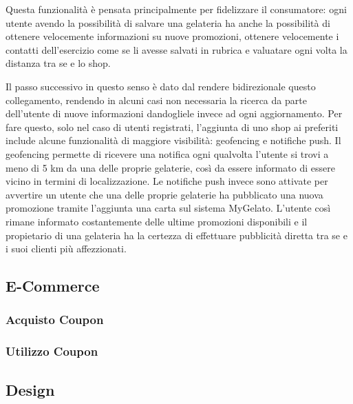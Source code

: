 Questa funzionalità è pensata principalmente per fidelizzare il consumatore: ogni utente avendo la possibilità di salvare una gelateria ha anche la possibilità di ottenere velocemente informazioni su nuove promozioni, ottenere velocemente i contatti dell'esercizio come se li avesse salvati in rubrica e valuatare ogni volta la distanza tra se e lo shop.

Il passo successivo in questo senso è dato dal rendere bidirezionale questo collegamento, rendendo in alcuni casi non necessaria la ricerca da parte dell'utente di nuove informazioni dandogliele invece ad ogni aggiornamento.
Per fare questo, solo nel caso di utenti registrati, l'aggiunta di uno shop ai preferiti include alcune funzionalità di maggiore visibilità: geofencing e notifiche push.
Il geofencing permette di ricevere una notifica ogni qualvolta l'utente si trovi a meno di 5 km da una delle proprie gelaterie, così da essere informato di essere vicino in termini di localizzazione.
Le notifiche push invece sono attivate per avvertire un utente che una delle proprie gelaterie ha pubblicato una nuova promozione tramite l'aggiunta una carta sul sistema MyGelato.
L'utente così rimane informato costantemente delle ultime promozioni disponibili e il propietario di una gelateria ha la certezza di effettuare pubblicità diretta tra se e i suoi clienti più affezzionati.


\subsection{E-Commerce}

\subsubsection{Acquisto Coupon}

\subsubsection{Utilizzo Coupon}

\subsection{Design}

\newpage